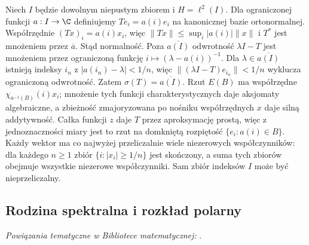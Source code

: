 \begin{przyklad}
\label{ex:nonsep-spectrum32}
Niech $I$ będzie dowolnym niepustym zbiorem i $H=\ell^2(I)$.
Dla ograniczonej funkcji $a:I\to\C$ definiujemy
$Te_i=a(i)e_i$ na kanonicznej bazie ortonormalnej.
Współrzędnie $(Tx)_i=a(i)x_i$, więc
$\|Tx\|\le\sup_i|a(i)|\|x\|$ i $T^*$ jest mnożeniem
przez $\overline a$. Stąd normalność.
Poza $\overline{a(I)}$ odwrotność $\lambda I-T$ jest
mnożeniem przez ograniczoną funkcję $i\mapsto(\lambda-a(i))^{-1}$.
Dla $\lambda\in\overline{a(I)}$ istnieją indeksy $i_n$
z $|a(i_n)-\lambda|<1/n$, więc
$\|(\lambda I-T)e_{i_n}\|<1/n$ wyklucza ograniczoną
odwrotność. Zatem $\sigma(T)=\overline{a(I)}$.
Rzut $E(B)$ ma współrzędne $\chi_{a^{-1}(B)}(i)x_i$;
mnożenie tych funkcji charakterystycznych daje aksjomaty
algebraiczne, a zbieżność zmajoryzowana po nośniku
współrzędnych $x$ daje silną addytywność.
Całka funkcji $z$ daje $T$ przez aproksymację prostą,
więc z jednoznaczności miary jest to rzut na domkniętą
rozpiętość $\{e_i:a(i)\in B\}$. Każdy wektor ma co najwyżej przeliczalnie wiele
niezerowych współczynników: dla każdego $n\ge1$ zbiór
$\{i:|x_i|\ge1/n\}$ jest skończony, a suma tych zbiorów
obejmuje wszystkie niezerowe współczynniki.
Sam zbiór indeksów $I$ może być nieprzeliczalny.
\end{przyklad}

\subsection{Rodzina spektralna i rozkład polarny}

\noindent\emph{Powiązania tematyczne w Bibliotece matematycznej:} .


